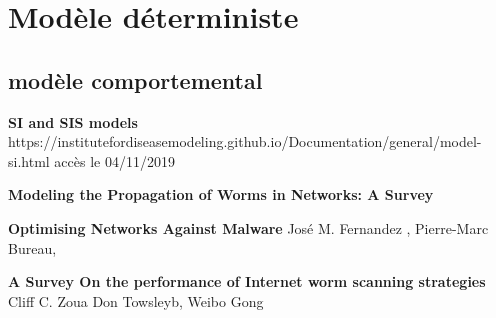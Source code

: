 \documentclass[a4paper, 12pt, french]{article}
\begin{document}
\section{Modèle déterministe}
\subsection{modèle comportemental}


\newpage


\begin{thebibliography}{9}
\textbf{SI and SIS models} https://institutefordiseasemodeling.github.io/Documentation/general/model-si.html accès le 04/11/2019

\textbf{Modeling the Propagation of Worms in Networks:
A Survey}

\textbf{Optimising Networks Against Malware} José M. Fernandez , Pierre-Marc Bureau, 

\textbf{A Survey On the performance of Internet worm scanning strategies} Cliff C. Zoua Don Towsleyb, Weibo Gong

 



\end{thebibliography}
\end{document}
